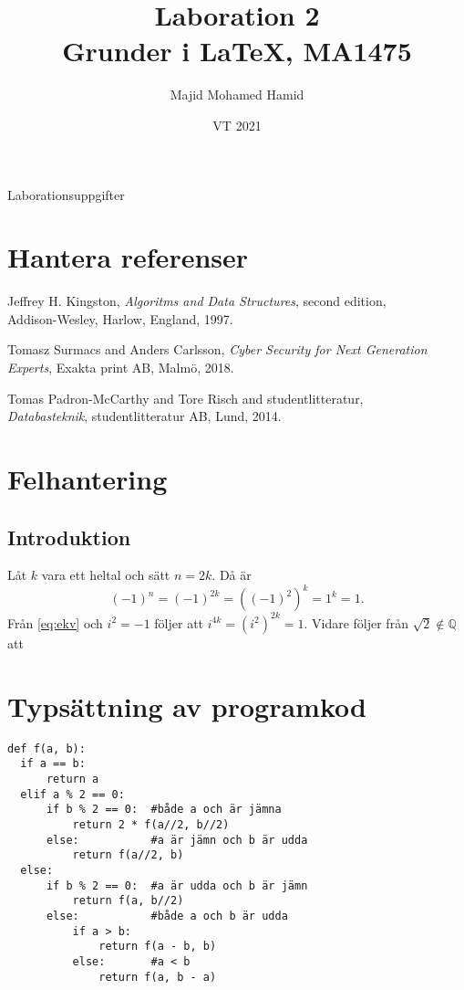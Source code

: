 \documentclass[a4paper, titlepage]{article}
\title{Laboration 2\\Grunder i \LaTeX, MA1475}%
\author{Majid Mohamed Hamid}
\date{VT 2021}
\begin{document}
\maketitle
\begin{center} 
Laborationsuppgifter 
\end{center}

\section{Hantera referenser}
\begin{thebibliography}{0}
 Jeffrey H. Kingston, \emph{Algoritms and Data Structures}, second edition,\\ Addison-Wesley, Harlow, England, 1997.

 Tomasz Surmacs and Anders Carlsson, \emph{Cyber Security for Next Generation\\Experts}, Exakta print AB, Malmö, 2018.

 Tomas Padron-McCarthy and Tore Risch and studentlitteratur, \\\emph{Databasteknik}, studentlitteratur AB, Lund, 2014. 
\end{thebibliography}

\section{Felhantering}
\subsection*{Introduktion}
Låt $k$ vara ett heltal och sätt $n = 2k$. Då är
\begin{equation}\label{eq:ekv}
(-1)^n = (-1)^{2k} = ((-1)^2)^k = 1^k = 1.
\end{equation}
Från \ref{eq:ekv} och $i^2 = -1$ följer att $i^{4k} = (i^2)^{2k} = 1.$ 
Vidare följer från $\sqrt{2} \notin \mathbb{Q}$ att


\section{Typsättning av programkod}
\begin{verbatim}
def f(a, b):
  if a == b:
      return a
  elif a % 2 == 0:
      if b % 2 == 0:  #både a och är jämna
          return 2 * f(a//2, b//2)
      else:           #a är jämn och b är udda
          return f(a//2, b)
  else:
      if b % 2 == 0:  #a är udda och b är jämn
          return f(a, b//2)
      else:           #både a och b är udda
          if a > b:
              return f(a - b, b)
          else:       #a < b
              return f(a, b - a)
\end{verbatim}                
\end{document}
